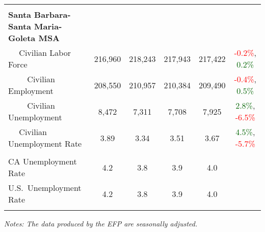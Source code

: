 \documentclass[12pt]{article}
\begin{document}
\begin{landscape}
\begin{table}
\begin{tabular}{|l|c|c|c|c|c|}
&&&&& \\
\textbf{Santa Barbara-Santa Maria-Goleta MSA} &&&&& \\
$\quad$ Civilian Labor Force &216,960 & 218,243 & 217,943 & 217,422 & \textcolor{red}{-0.2\%}, \textcolor{darkgreen}{0.2\%} \\
$\qquad$ \small Civilian Employment &208,550 & 210,957 & 210,384 & 209,490 & \textcolor{red}{-0.4\%}, \textcolor{darkgreen}{0.5\%} \\
$\qquad$ \small Civilian Unemployment &8,472 & 7,311 & 7,708 & 7,925 & \textcolor{darkgreen}{2.8\%}, \textcolor{red}{-6.5\%} \\
$\quad$ Civilian Unemployment Rate &3.89 & 3.34 & 3.51 & 3.67 & \textcolor{darkgreen}{4.5\%}, \textcolor{red}{-5.7\%} \\
&&&&& \\
CA Unemployment Rate & 4.2 & 3.8 & 3.9 & 4.0 & \\
U.S.\ Unemployment Rate & 4.2 & 3.8 & 3.9 & 4.0 & \\
& & & & & \\ \hline \hline
\end{tabular}
\par
\vspace{.5em}
\footnotesize
\textit{Notes: The data produced by the EFP are seasonally adjusted.}
\end{table}
\end{landscape}
\end{document}

